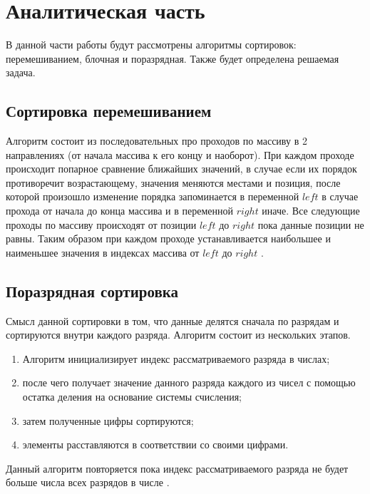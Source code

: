 \chapter{Аналитическая часть}
В данной части работы будут рассмотрены алгоритмы сортировок: перемешиванием, блочная и поразрядная. Также будет определена решаемая задача.






\section{Сортировка перемешиванием}
Алгоритм состоит из последовательных про проходов по массиву в 2 направлениях (от начала массива к его концу и наоборот). При каждом проходе 
происходит попарное сравнение ближайших значений, в случае если их порядок противоречит возрастающему, значения меняются местами и позиция,
после которой произошло изменение порядка запоминается в переменной $left$ в случае прохода от начала до конца массива и в переменной $right$ иначе.
Все следующие проходы по массиву происходят от позиции $left$ до $right$ пока данные позиции не равны. Таким образом при каждом проходе устанавливается
наибольшее и наименьшее значения в индексах массива от $left$ до $right$ \cite{conctail_sort,article_sorts}.

\section{Поразрядная сортировка}
Смысл данной сортировки в том, что данные делятся сначала по разрядам и сортируются внутри каждого разряда.
Алгоритм состоит из нескольких этапов.
\begin{enumerate}
	\item Алгоритм инициализирует индекс рассматриваемого разряда в числах;
	\item после чего получает значение данного разряда каждого из чисел с помощью остатка деления на основание системы счисления;
	\item затем полученные цифры сортируются;
	\item элементы расставляются в соответствии со своими цифрами.
\end{enumerate}
Данный алгоритм повторяется пока индекс рассматриваемого разряда не будет больше числа всех разрядов в числе \cite{book_knut,article_sorts}.

